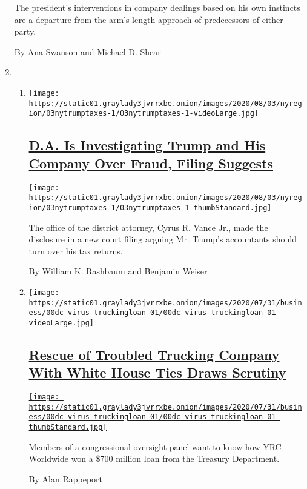 \begin{enumerate}
  The president's interventions in company dealings based on his own
  instincts are a departure from the arm's-length approach of
  predecessors of either party.

  By Ana Swanson and Michael D. Shear
\item
  \begin{enumerate}
  \def\labelenumii{\arabic{enumii}.}
  \item
    \texttt{[image: https://static01.graylady3jvrrxbe.onion/images/2020/08/03/nyregion/03nytrumptaxes-1/03nytrumptaxes-1-videoLarge.jpg]}

    \hypertarget{da-is-investigating-trump-and-his-company-over-fraud-filing-suggests}{%
    \subsection{\texorpdfstring{\href{/2020/08/03/nyregion/donald-trump-taxes-cyrus-vance.html}{D.A.
    Is Investigating Trump and His Company Over Fraud, Filing
    Suggests}}{D.A. Is Investigating Trump and His Company Over Fraud, Filing Suggests}}\label{da-is-investigating-trump-and-his-company-over-fraud-filing-suggests}}

    \href{/2020/08/03/nyregion/donald-trump-taxes-cyrus-vance.html}{\texttt{[image: https://static01.graylady3jvrrxbe.onion/images/2020/08/03/nyregion/03nytrumptaxes-1/03nytrumptaxes-1-thumbStandard.jpg]}}

    The office of the district attorney, Cyrus R. Vance Jr., made the
    disclosure in a new court filing arguing Mr. Trump's accountants
    should turn over his tax returns.

    By William K. Rashbaum and Benjamin Weiser
  \item
    \texttt{[image: https://static01.graylady3jvrrxbe.onion/images/2020/07/31/business/00dc-virus-truckingloan-01/00dc-virus-truckingloan-01-videoLarge.jpg]}

    \hypertarget{rescue-of-troubled-trucking-company-with-white-house-ties-draws-scrutiny}{%
    \subsection{\texorpdfstring{\href{/2020/08/03/us/politics/yrc-coronavirus-relief-funds.html}{Rescue
    of Troubled Trucking Company With White House Ties Draws
    Scrutiny}}{Rescue of Troubled Trucking Company With White House Ties Draws Scrutiny}}\label{rescue-of-troubled-trucking-company-with-white-house-ties-draws-scrutiny}}

    \href{/2020/08/03/us/politics/yrc-coronavirus-relief-funds.html}{\texttt{[image: https://static01.graylady3jvrrxbe.onion/images/2020/07/31/business/00dc-virus-truckingloan-01/00dc-virus-truckingloan-01-thumbStandard.jpg]}}

    Members of a congressional oversight panel want to know how YRC
    Worldwide won a \$700 million loan from the Treasury Department.

    By Alan Rappeport
  \end{enumerate}
\end{enumerate}

